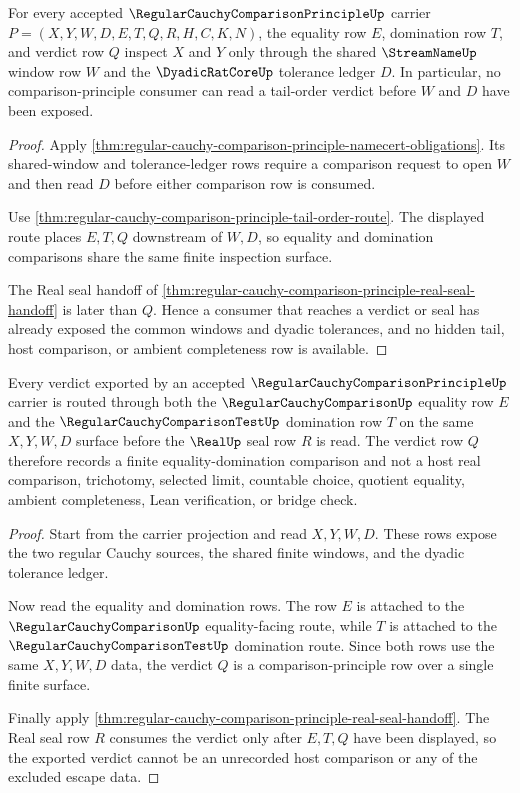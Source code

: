 \begin{theorem}
\label{thm:regular-cauchy-comparison-principle-shared-window-exposure}
For every accepted $\RegularCauchyComparisonPrincipleUp$ carrier $P=(X,Y,W,D,E,T,Q,R,H,C,K,N)$, the equality row $E$, domination row $T$, and verdict row $Q$ inspect $X$ and $Y$ only through the shared $\StreamNameUp$ window row $W$ and the $\DyadicRatCoreUp$ tolerance ledger $D$. In particular, no comparison-principle consumer can read a tail-order verdict before $W$ and $D$ have been exposed.
\end{theorem}
\begin{proof}
Apply \autoref{thm:regular-cauchy-comparison-principle-namecert-obligations}. Its shared-window and tolerance-ledger rows require a comparison request to open $W$ and then read $D$ before either comparison row is consumed.

Use \autoref{thm:regular-cauchy-comparison-principle-tail-order-route}. The displayed route places $E,T,Q$ downstream of $W,D$, so equality and domination comparisons share the same finite inspection surface.

The Real seal handoff of \autoref{thm:regular-cauchy-comparison-principle-real-seal-handoff} is later than $Q$. Hence a consumer that reaches a verdict or seal has already exposed the common windows and dyadic tolerances, and no hidden tail, host comparison, or ambient completeness row is available.
\end{proof}

\begin{theorem}
\label{thm:regular-cauchy-comparison-principle-equality-domination-verdict}
Every verdict exported by an accepted $\RegularCauchyComparisonPrincipleUp$ carrier is routed through both the $\RegularCauchyComparisonUp$ equality row $E$ and the $\RegularCauchyComparisonTestUp$ domination row $T$ on the same $X,Y,W,D$ surface before the $\RealUp$ seal row $R$ is read. The verdict row $Q$ therefore records a finite equality-domination comparison and not a host real comparison, trichotomy, selected limit, countable choice, quotient equality, ambient completeness, Lean verification, or bridge check.
\end{theorem}
\begin{proof}
Start from the carrier projection and read $X,Y,W,D$. These rows expose the two regular Cauchy sources, the shared finite windows, and the dyadic tolerance ledger.

Now read the equality and domination rows. The row $E$ is attached to the $\RegularCauchyComparisonUp$ equality-facing route, while $T$ is attached to the $\RegularCauchyComparisonTestUp$ domination route. Since both rows use the same $X,Y,W,D$ data, the verdict $Q$ is a comparison-principle row over a single finite surface.

Finally apply \autoref{thm:regular-cauchy-comparison-principle-real-seal-handoff}. The Real seal row $R$ consumes the verdict only after $E,T,Q$ have been displayed, so the exported verdict cannot be an unrecorded host comparison or any of the excluded escape data.
\end{proof}

